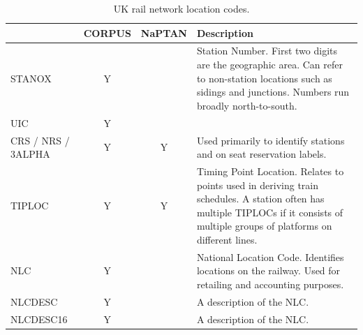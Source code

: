 \documentclass[12pt,a4paper]{article}
\begin{document}
\begin{table}[h!]
\centering
\caption{UK rail network location codes.}
\label{table:codes}
\begin{tabular}{|p{2.5cm}|c|c|p{8cm}|}
\hline
\textbf{}          & \multicolumn{1}{l|}{\textbf{CORPUS}} & \multicolumn{1}{l|}{\textbf{NaPTAN}} & \textbf{Description}                                                                                                                                                                \\ \hline
STANOX             & Y                                    &                                      & Station Number. First two digits are the geographic area. Can refer to non-station locations such as sidings and junctions. Numbers run broadly north-to-south.                     \\ \hline
UIC                & Y                                    &                                      &                                                                                                                                                                                     \\ \hline
CRS / NRS / 3ALPHA & Y                                    & Y                                    & Used primarily to identify stations and on seat reservation labels.                                                                                                                 \\ \hline
TIPLOC             & Y                                    & Y                                    & Timing Point Location. Relates to points used in deriving train schedules. A station often has multiple TIPLOCs if it consists of  multiple groups of platforms on different lines. \\ \hline
NLC                & Y                                    &                                      & National  Location Code. Identifies locations on the railway. Used for retailing and accounting purposes.                                                                           \\ \hline
NLCDESC            & Y                                    &                                      & A description of the NLC.                                                                                                                                                           \\ \hline
NLCDESC16          & Y                                    &                                      & A description of the NLC.                                                                                                                                                           \\ \hline

\end{tabular}
\end{table}
\end{document}
